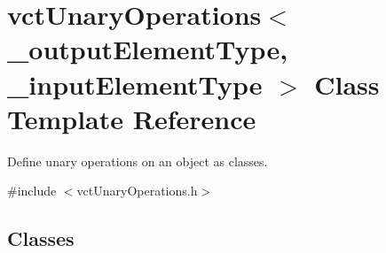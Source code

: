 \hypertarget{classvct_unary_operations}{}\section{vct\+Unary\+Operations$<$ \+\_\+output\+Element\+Type, \+\_\+input\+Element\+Type $>$ Class Template Reference}
\label{classvct_unary_operations}


Define unary operations on an object as classes.  




{\ttfamily \#include $<$vct\+Unary\+Operations.\+h$>$}

\subsection*{Classes}

